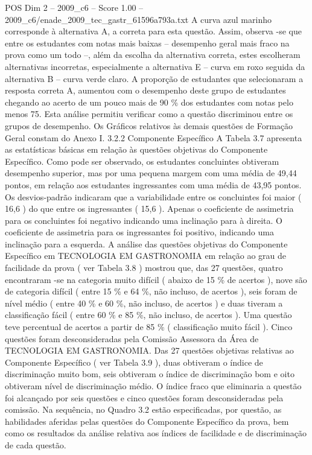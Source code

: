 \begin{textsample}{POS Dim 2 – 2009\_c6 – Score 1.00 – 2009\_c6/enade\_2009\_tec\_gastr\_61596a793a.txt}
A curva azul marinho corresponde à alternativa A, a correta para esta questão.
Assim, observa -se que entre os estudantes com notas mais baixas – desempenho geral mais fraco na prova como um todo –, além da escolha da alternativa correta, estes escolheram alternativas incorretas, especialmente a alternativa E – curva em roxo seguida da alternativa B – curva verde claro.
A proporção de estudantes que selecionaram a resposta correta A, aumentou com o desempenho deste grupo de estudantes chegando ao acerto de um pouco mais de 90 \% dos estudantes com notas pelo menos 75.
Esta análise permitiu verificar como a questão discriminou entre os grupos de desempenho.
Os Gráficos relativos às demais questões de Formação Geral constam do Anexo I. 3.2.2 Componente Específico A Tabela 3.7 apresenta as estatísticas básicas em relação às questões objetivas do Componente Específico.
Como pode ser observado, os estudantes concluintes obtiveram desempenho superior, mas por uma pequena margem com uma média de 49,44 pontos, em relação aos estudantes ingressantes com uma média de 43,95 pontos.
Os desvios-padrão indicaram que a variabilidade entre os concluintes foi maior ( 16,6 ) do que entre os ingressantes ( 15,6 ).
Apenas o coeficiente de assimetria para os concluintes foi negativo indicando uma inclinação para à direita.
O coeficiente de assimetria para os ingressantes foi positivo, indicando uma inclinação para a esquerda.
A análise das questões objetivas do Componente Específico em TECNOLOGIA EM GASTRONOMIA em relação ao grau de facilidade da prova ( ver Tabela 3.8 ) mostrou que, das 27 questões, quatro encontraram -se na categoria muito difícil ( abaixo de 15 \% de acertos ), nove são de categoria difícil ( entre 15 \% e 64 \%, não incluso, de acertos ), seis foram de nível médio ( entre 40 \% e 60 \%, não incluso, de acertos ) e duas tiveram a classificação fácil ( entre 60 \% e 85 \%, não incluso, de acertos ).
Uma questão teve percentual de acertos a partir de 85 \% ( classificação muito fácil ).
Cinco questões foram desconsideradas pela Comissão Assessora da Área de TECNOLOGIA EM GASTRONOMIA.
Das 27 questões objetivas relativas ao Componente Específico ( ver Tabela 3.9 ), duas obtiveram o índice de discriminação muito bom, seis obtiveram o índice de discriminação bom e oito obtiveram nível de discriminação médio.
O índice fraco que eliminaria a questão foi alcançado por seis questões e cinco questões foram desconsideradas pela comissão.
Na sequência, no Quadro 3.2 estão especificadas, por questão, as habilidades aferidas pelas questões do Componente Específico da prova, bem como os resultados da análise relativa aos índices de facilidade e de discriminação de cada questão.

\end{textsample}

